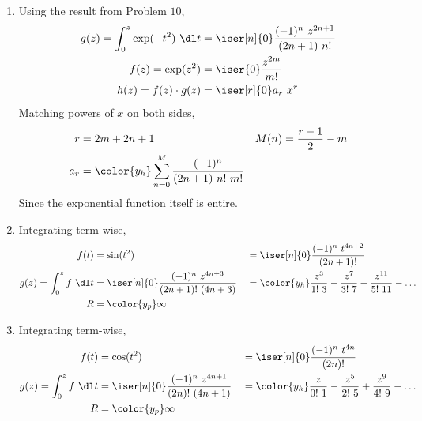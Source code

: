 \begin{enumerate}
    \item Using the result from Problem $ 10 $,
          \begin{align}
              g(z) = \int_0^z \exp(-t^2)\ \dl t & = \iser[n]{0}
              \frac{(-1)^n\ z^{2n+1}}{(2n+1)\ n!}                              \\
              f(z) = \exp(z^2)                  & = \iser{0} \frac{z^{2m}}{m!} \\
              h(z) = f(z) \cdot g(z)            & = \iser[r]{0} a_r\ x^r
          \end{align}
          Matching powers of $ x $ on both sides,
          \begin{align}
              r    & = 2m+2n+1                                                  &
              M(n) & = \frac{r - 1}{2} - m                                        \\
              a_r  & = \color{y_h} \sum_{n=0}^{M} \frac{(-1)^n}{(2n+1)\ n!\ m!}
          \end{align}
          Since the exponential function itself is entire.

    \item Integrating term-wise,
          \begin{align}
              f(t)                     & = \sin(t^2)                           &
                                       & = \iser[n]{0} \frac{(-1)^n\ t^{4n+2}}
              {(2n+1)!}                                                          \\
              g(z) = \int_0^z f\ \dl t & = \iser[n]{0} \frac{(-1)^n\ z^{4n+3}}
              {(2n+1)!\ (4n+3)}        &
                                       & = \color{y_h} \frac{z^3}{1!\ 3}
              - \frac{z^7}{3!\ 7} + \frac{z^{11}}{5!\ 11} - \dots                \\
              R                        & = \color{y_p} \infty
          \end{align}

    \item Integrating term-wise,
          \begin{align}
              f(t)                     & = \cos(t^2)                           &
                                       & = \iser[n]{0} \frac{(-1)^n\ t^{4n}}
              {(2n)!}                                                            \\
              g(z) = \int_0^z f\ \dl t & = \iser[n]{0} \frac{(-1)^n\ z^{4n+1}}
              {(2n)!\ (4n+1)}          &
                                       & = \color{y_h} \frac{z}{0!\ 1}
              - \frac{z^5}{2!\ 5} + \frac{z^9}{4!\ 9} - \dots                    \\
              R                        & = \color{y_p} \infty
          \end{align}


\end{enumerate}
